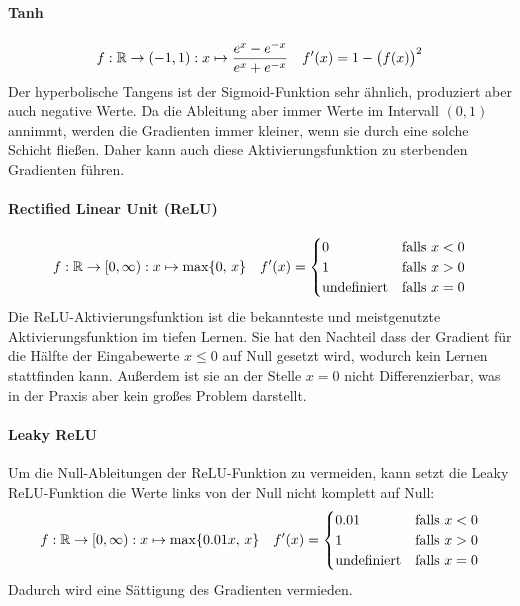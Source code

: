 		\paragraph{Tanh}
			\begin{align}
				f : \mathbb{R} \to (-1, 1) : x \mapsto \frac{e^x - e^{-x}}{e^x + e^{-x}} &&
				f'(x) = 1 - \big( f(x) \big)^2
			\end{align}
			Der hyperbolische Tangens ist der Sigmoid-Funktion sehr ähnlich, produziert aber auch negative Werte. Da die Ableitung aber immer Werte im Intervall \( (0, 1) \) annimmt, werden die Gradienten immer kleiner, wenn sie durch eine solche Schicht fließen. Daher kann auch diese Aktivierungsfunktion zu sterbenden Gradienten führen.

		\paragraph{Rectified Linear Unit (ReLU)}
			\begin{align}
				f : \mathbb{R} \to [0, \infty) : x \mapsto \max \{ 0,\, x \} &&
				f'(x) =
					\begin{cases}
						0 & \text{falls } x < 0 \\
						1 & \text{falls } x > 0 \\
						\text{undefiniert} & \text{falls } x = 0
					\end{cases}
			\end{align}
			Die ReLU-Aktivierungsfunktion ist die bekannteste und meistgenutzte Aktivierungsfunktion im tiefen Lernen. Sie hat den Nachteil dass der Gradient für die Hälfte der Eingabewerte \(x \leq 0\) auf Null gesetzt wird, wodurch kein Lernen stattfinden kann. Außerdem ist sie an der Stelle \(x = 0\) nicht Differenzierbar, was in der Praxis aber kein großes Problem darstellt.

		\paragraph{Leaky ReLU}
			Um die Null-Ableitungen der ReLU-Funktion zu vermeiden, kann setzt die Leaky ReLU-Funktion die Werte links von der Null nicht komplett auf Null:
			\begin{align}
				f : \mathbb{R} \to [0, \infty) : x \mapsto \max \{ 0.01x,\, x \} &&
				f'(x) =
					\begin{cases}
						0.01 & \text{falls } x < 0 \\
						1 & \text{falls } x > 0 \\
						\text{undefiniert} & \text{falls } x = 0
					\end{cases}
			\end{align}
			Dadurch wird eine Sättigung des Gradienten vermieden.

